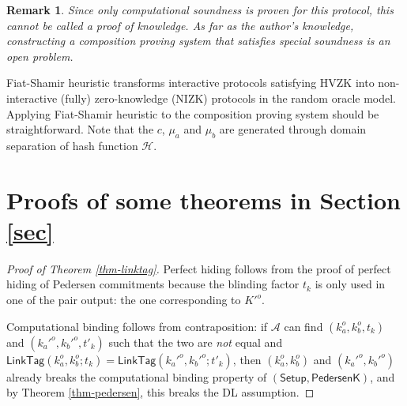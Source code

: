 \documentclass{article}
\newtheorem*{remark}{Remark}
\begin{document}
\begin{remark}
{\normalfont
Since only computational soundness is proven for this protocol, this cannot be called a proof of knowledge. As far as the author's knowledge, constructing a composition proving system that satisfies special soundness is an open problem.}
\end{remark}

Fiat-Shamir heuristic transforms interactive protocols satisfying HVZK into non-interactive (fully) zero-knowledge (NIZK) protocols in the random oracle model. Applying Fiat-Shamir heuristic to the composition proving system should be straightforward. Note that the $c$, $\mu_a$ and $\mu_b$ are generated through domain separation of hash function $\mathcal{H}$.

\section{Proofs of some theorems in Section \ref{sec}}\label{proofs}
\begin{proof}[Proof of Theorem \ref{thm-linktag}]
Perfect hiding follows from the proof of perfect hiding of Pedersen commitments because the blinding factor $t_k$ is only used in one of the pair output: the one corresponding to $K'^o$.

Computational binding follows from contraposition: if $\mathcal{A}$ can find $(k_a^o, k_b^o, t_k)$ and $(k_a'^o, k_b'^o, t'_k)$ such that the two are \textit{not} equal and $\textsf{LinkTag}(k_a^o, k_b^o; t_k) = \textsf{LinkTag}(k_a'^o, k_b'^o; t'_k)$, then $(k_a^o, k_b^o)$ and $(k_a'^o, k_b'^o)$ already breaks the computational binding property of $(\textsf{Setup}, \textsf{PedersenK})$, and by Theorem \ref{thm-pedersen}, this breaks the DL assumption.
\end{proof}
\end{document}
